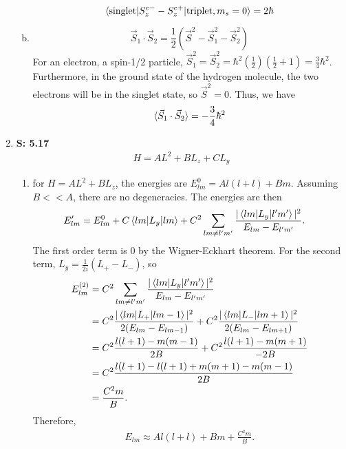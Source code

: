 \documentclass[12pt, letterpaper]{article}
\begin{document}
\begin{enumerate}
\begin{enumerate}[(a)]
\begin{equation}
        \braket{\text{singlet}|S_z^{e-}-S_z^{e+}|\text{triplet},m_s=0}=2\hbar
\end{equation}
\item
\begin{equation}
        \vec{S}_1\cdot \vec{S}_2=\frac{1}{2}\left(\vec{S}^2-\vec{S}_1^2-\vec{S}_2^2\right)
\end{equation}
For an electron, a spin-1/2 particle, $\vec{S}_1^2=\vec{S}_2^2=\hbar^2\left(\frac{1}{2}\right)\left(\frac{1}{2}+1\right)=\frac{3}{4}\hbar^2$. Furthermore, in the ground state of the hydrogen molecule, the two electrons will be in the singlet state, so $\vec{S}^2=0$. Thus, we have
\begin{equation}
        \braket{\vec{S}_1\cdot \vec{S}_2}=-\frac{3}{4}\hbar^2
\end{equation}
\end{enumerate}


\item[] \textbf{S: 5.17}
\begin{align}
    H = AL^2+BL_z+CL_y
\end{align}
\begin{enumerate}
\item
for $H=AL^2+BL_z$, the energies are $E^0_{lm} = Al(l+l)+Bm$. Assuming $B<<A$, there are no degeneracies. The energies are then
\begin{align}
E'_{lm} &= E^0_{lm} + C\braket{lm|L_y|lm} + C^2\sum_{lm\neq l'm'}
    \frac{|\braket{lm|L_y|l'm'}|^2}{E_{lm}-E_{l'm'}}.
\end{align}
The first order term is 0 by the Wigner-Eckhart theorem. For the second term, $L_y=\frac{1}{2i}(L_+-L_-)$, so
\begin{align}
E_{lm}^{(2)} &= C^2\sum_{lm\neq l'm'}\frac{|\braket{lm|L_y|l'm'}|^2}
    {E_{lm}-E_{l'm'}}\\
&= C^2\frac{|\braket{lm|L_+|lm-1}|^2}{2(E_{lm}-E_{lm-1})} + 
    C^2\frac{|\braket{lm|L_-|lm+1}|^2}{2(E_{lm}-E_{lm+1})}\\
&= C^2\frac{l(l+1)-m(m-1)}{2B}+C^2\frac{l(l+1)-m(m+1)}{-2B}\\
&= C^2\frac{l(l+1)-l(l+1)+m(m+1)-m(m-1)}{2B}\\
&=\frac{C^2m}{B}.
\end{align}
Therefore,
\begin{align}
E_{lm}\approx \boxed{Al(l+l)+Bm+\frac{C^2m}{B}}.
\end{align}
\end{enumerate}
    

\end{enumerate}
\end{document}

